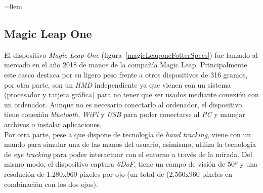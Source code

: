 \parindent=0em
\subsection{Magic Leap One}
\noindent

El dispositivo \textit{Magic Leap One} (figura~\ref{magicLeaponeFotterSpecs}) fue lanzado al mercado en el año 2018 de manos de la compañía Magic Leap. Principalmente este casco destaca por su ligero peso frente a otros dispositivos de 316 gramos, por otra parte, son un \textit{HMD} independiente ya que vienen con un sistema (procesador y tarjeta gráfica) para no tener que ser usados mediante conexión con un ordenador. Aunque no es necesario conectarlo al ordenador, el dispositivo tiene conexión \textit{bluetooth}, \textit{WiFi} y \textit{USB} para poder conectarse al \textit{PC} y manejar archivos o instalar aplicaciones.\\

Por otra parte, pese a que dispone de tecnología de \textit{hand tracking}, viene con un mando para simular una de las manos del usuario, asimismo, utiliza la tecnología de \textit{eye tracking} para poder interactuar con el entorno a través de la mirada. Del mismo modo, el dispositivo captura \textit{6DoF}, tiene un campo de visión de 50º y una resolución de 1.280x960 píxeles por ojo (un total de (2.560x960 píxeles en combinación con los dos ojos).
 

